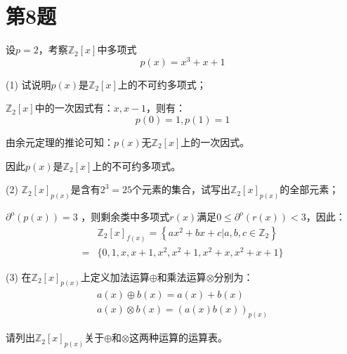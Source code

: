 \section{第8题}
设$p=2$，考察$\mathbb{Z}_2[x]$中多项式
\begin{equation}
    p(x) = x^3 + x + 1
\end{equation}

(1) 试说明$p(x)$是$\mathbb{Z}_2[x]$上的不可约多项式；

\begin{Solution}
    $\mathbb{Z}_2[x]$中的一次因式有：$x,x-1$，则有：
    \begin{equation}
        p(0) = 1, p(1) = 1
    \end{equation}
    
    由余元定理的推论可知：$p(x)$无$\mathbb{Z}_2[x]$上的一次因式。

    因此$p(x)$是$\mathbb{Z}_2[x]$上的不可约多项式。
\end{Solution}

(2) $\mathbb{Z}_2[x]_{p(x)}$是含有$2^3=25$个元素的集合，试写出$\mathbb{Z}_2[x]_{p(x)}$的全部元素；

\begin{Solution}
    $\partial^o(p(x))=3$
    ，则剩余类中多项式$r(x)$满足$0\le \partial^o(r(x)) < 3$，因此：
    \begin{equation}
        \begin{aligned}
            &\mathbb{Z}_2[x]_{f(x)} = \left\{ax^2+bx+c|a,b,c \in \mathbb{Z}_2\right\}\\
            =&\{0,1,x,x+1,x^2,x^2+1,x^2+x,x^2+x+1\}
        \end{aligned}
    \end{equation}
\end{Solution}

(3) 在$\mathbb{Z}_2[x]_{p(x)}$上定义加法运算$\oplus$和乘法运算$\otimes$分别为：
\begin{equation}
    \begin{aligned}
        a(x) \oplus b(x) = a(x) + b(x)\\
        a(x) \otimes b(x) = (a(x)b(x))_{p(x)}
    \end{aligned}
\end{equation}

请列出$\mathbb{Z}_2[x]_{p(x)}$关于$\oplus$和$\otimes$这两种运算的运算表。


